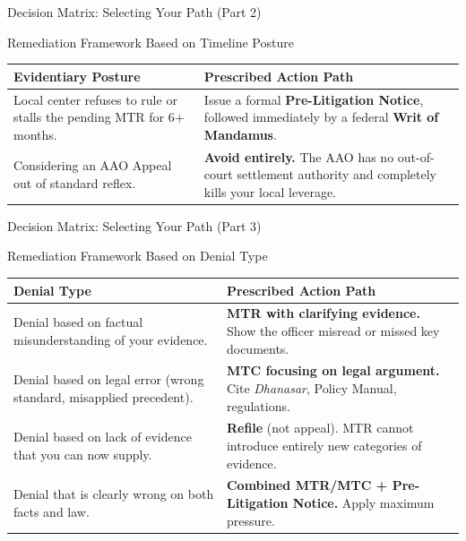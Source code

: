 \documentclass[11pt]{beamer}
\begin{document}
	\begin{frame}{Decision Matrix: Selecting Your Path (Part 2)}
		\scriptsize
		\begin{block}{Remediation Framework Based on Timeline Posture}
			\centering
			\begin{tabular}{|p{4cm}|p{6.5cm}|}
				\hline
				\textbf{Evidentiary Posture} & \textbf{Prescribed Action Path} \\
				\hline
				Local center refuses to rule or stalls the pending MTR for 6+ months. & Issue a formal \textbf{Pre-Litigation Notice}, followed immediately by a federal \textbf{Writ of Mandamus}. \\
				\hline
				Considering an AAO Appeal out of standard reflex. & \textbf{Avoid entirely.} The AAO has no out-of-court settlement authority and completely kills your local leverage. \\
				\hline
			\end{tabular}
		\end{block}
	\end{frame}
	
	\begin{frame}{Decision Matrix: Selecting Your Path (Part 3)}
		\scriptsize
		\begin{block}{Remediation Framework Based on Denial Type}
			\centering
			\begin{tabular}{|p{4cm}|p{6.5cm}|}
				\hline
				\textbf{Denial Type} & \textbf{Prescribed Action Path} \\
				\hline
				Denial based on factual misunderstanding of your evidence. & \textbf{MTR with clarifying evidence.} Show the officer misread or missed key documents. \\
				\hline
				Denial based on legal error (wrong standard, misapplied precedent). & \textbf{MTC focusing on legal argument.} Cite \textit{Dhanasar}, Policy Manual, regulations. \\
				\hline
				Denial based on lack of evidence that you can now supply. & \textbf{Refile} (not appeal). MTR cannot introduce entirely new categories of evidence. \\
				\hline
				Denial that is clearly wrong on both facts and law. & \textbf{Combined MTR/MTC + Pre-Litigation Notice.} Apply maximum pressure. \\
				\hline
			\end{tabular}
		\end{block}
	\end{frame}
	
\end{document}
